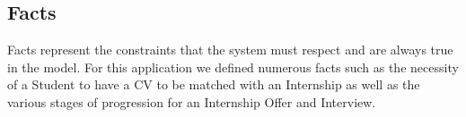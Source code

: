 \subsection{Facts}
Facts represent the constraints that the system must respect and are always true in the model. For this application we defined numerous facts such as the necessity of a Student to have a CV to be matched with an Internship as well as the various stages of progression for an Internship Offer and Interview.

